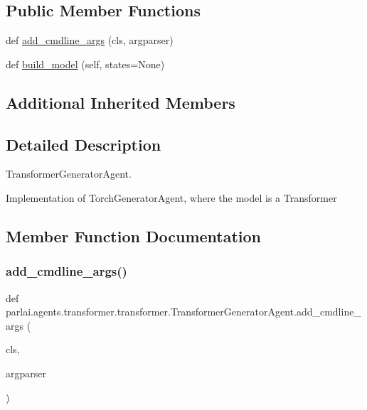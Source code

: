 \subsection*{Public Member Functions}
\begin{DoxyCompactItemize}
\item 
def \hyperlink{classparlai_1_1agents_1_1transformer_1_1transformer_1_1TransformerGeneratorAgent_a496b5ccc5efe17f290c37dc094ff74e8}{add\+\_\+cmdline\+\_\+args} (cls, argparser)
\item 
def \hyperlink{classparlai_1_1agents_1_1transformer_1_1transformer_1_1TransformerGeneratorAgent_a473f2a19d6bce412c4c9163c7beb9b09}{build\+\_\+model} (self, states=None)
\end{DoxyCompactItemize}
\subsection*{Additional Inherited Members}


\subsection{Detailed Description}
\begin{DoxyVerb}TransformerGeneratorAgent.

Implementation of TorchGeneratorAgent, where the model is a Transformer
\end{DoxyVerb}
 

\subsection{Member Function Documentation}
\mbox{\label{classparlai_1_1agents_1_1transformer_1_1transformer_1_1TransformerGeneratorAgent_a496b5ccc5efe17f290c37dc094ff74e8}} 
\subsubsection{\texorpdfstring{add\+\_\+cmdline\+\_\+args()}{add\_cmdline\_args()}}
{\footnotesize\ttfamily def parlai.\+agents.\+transformer.\+transformer.\+Transformer\+Generator\+Agent.\+add\+\_\+cmdline\+\_\+args (\begin{DoxyParamCaption}\item[{}]{cls,  }\item[{}]{argparser }\end{DoxyParamCaption})}

